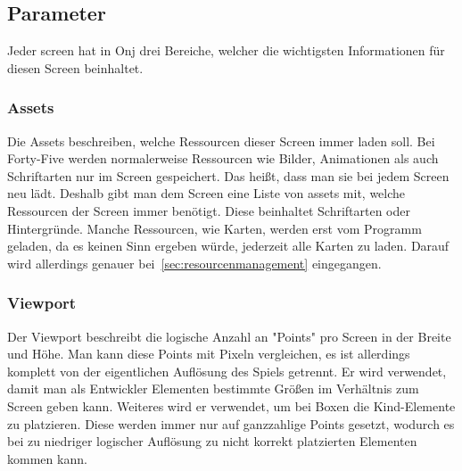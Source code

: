 \renewcommand{\kapitelautor}{Autor: Felix Zwickelstorfer}
\subsection{Parameter}\label{subsec:parameter}
\renewcommand{\kapitelautor}{Autor: Felix Zwickelstorfer}

Jeder screen hat in Onj drei Bereiche, welcher die wichtigsten Informationen für diesen Screen beinhaltet.


\renewcommand{\kapitelautor}{Autor: Felix Zwickelstorfer}
\subsubsection{Assets}\label{subsubsec:assets}
\renewcommand{\kapitelautor}{Autor: Felix Zwickelstorfer}
Die Assets beschreiben, welche Ressourcen dieser Screen immer laden soll.
Bei Forty-Five werden normalerweise Ressourcen wie Bilder, Animationen als auch Schriftarten nur im Screen gespeichert.
Das heißt, dass man sie bei jedem Screen neu lädt.
Deshalb gibt man dem Screen eine Liste von assets mit, welche Ressourcen der Screen immer benötigt.
Diese beinhaltet \zB Schriftarten oder Hintergründe.
Manche Ressourcen, wie \zB Karten, werden erst vom Programm geladen, da es keinen Sinn ergeben würde, jederzeit alle Karten zu laden.
Darauf wird allerdings genauer bei~\ref{sec:resourcenmanagement} eingegangen.

\renewcommand{\kapitelautor}{Autor: Felix Zwickelstorfer}
\subsubsection{Viewport}\label{subsubsec:viewport}
\renewcommand{\kapitelautor}{Autor: Felix Zwickelstorfer}
Der Viewport beschreibt die logische Anzahl an "Points" pro Screen in der Breite und Höhe.
Man kann diese Points mit Pixeln vergleichen, es ist allerdings komplett von der eigentlichen Auflösung des Spiels getrennt.
Er wird verwendet, damit man als Entwickler Elementen bestimmte Größen im Verhältnis zum Screen geben kann.
Weiteres wird er verwendet, um bei Boxen die Kind-Elemente zu platzieren.
Diese werden immer nur auf ganzzahlige Points gesetzt, wodurch es bei zu niedriger logischer Auflösung zu nicht korrekt platzierten Elementen kommen kann.


\renewcommand{\kapitelautor}{Autor: Felix Zwickelstorfer}
